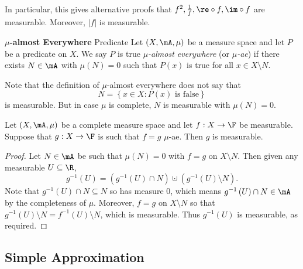 \documentclass[pmath451]{subfiles}
\begin{document}
    In particular, this gives alternative proofs that $f^{2}, \frac{1}{f}, \re\circ f, \im\circ f$ are measurable. Moreover, $\left| f \right|$ is measurable.
    
    \begin{definition}{\textbf{$\mu$-almost Everywhere} Predicate}
        Let $\left( X,\mA,\mu \right)$ be a measure space and let $P$ be a predicate on $X$. We say $P$ is true \emph{$\mu$-almost everywhere} (or \emph{$\mu$-ae}) if there exists $N\in\mA$ with $\mu\left( N \right) = 0$ such that $P\left( x \right)$ is true for all $x\in X\setminus N$.
    \end{definition}
    
    \np Note that the definition of $\mu$-almost everywhere does not say that
    \begin{equation*}
        N = \left\lbrace x\in X: \text{$P\left( x \right)$ is false} \right\rbrace
    \end{equation*}
    is measurable. But in case $\mu$ is complete, $N$ is measurable with $\mu\left( N \right) = 0$.

    \begin{prop}{}
        Let $\left( X,\mA,\mu \right)$ be a complete measure space and let $f:X\to\F$ be measurable. Suppose that $g:X\to\F$ is such that $f=g$ $\mu$-ae. Then $g$ is measurable.
    \end{prop}

    \begin{proof}
        Let $N\in\mA$ be such that $\mu\left( N \right) = 0$ with $f=g$ on $X\setminus N$. Then given any measurable $U\subseteq\R$,
        \begin{equation*}
            g^{-1}\left( U \right) = \left( g^{-1}\left( U \right)\cap N \right) \cupdot \left( g^{-1}\left( U \right)\setminus N \right).
        \end{equation*}
        Note that $g^{-1}\left( U \right)\cap N\subseteq N$ so has measure $0$, which means $g^{-1}\left( U \right)\cap N\in\mA$ by the completeness of $\mu$. Moreover, $f=g$ on $X\setminus N$ so that $g^{-1}\left( U \right)\setminus N = f^{-1}\left( U \right)\setminus N$, which is measurable. Thus $g^{-1}\left( U \right)$ is measurable, as required.
    \end{proof}

    \subsection{Simple Approximation}
    
\end{document}
